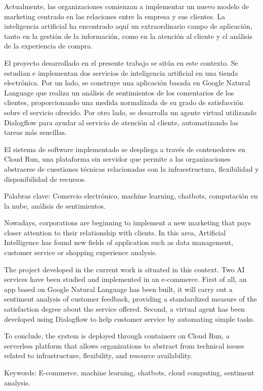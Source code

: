 
\normalsize {}	
Actualmente, las organizaciones comienzan a implementar un nuevo modelo de marketing
centrado en las relaciones entre la empresa y sus clientes. La inteligencia artificial ha encontrado aquí un extraordinario campo de aplicación, tanto en la gestión de la información, como en la atención al cliente y el análisis de la experiencia de compra.

El proyecto desarrollado en el presente trabajo se sitúa en este contexto. Se estudian e implementan dos servicios de inteligencia artificial en una tienda electrónica. Por un lado, se construye una aplicación basada en Google Natural Language que realiza un análisis de sentimientos de los comentarios de los clientes, proporcionando una medida normalizada de su grado de satisfacción sobre el servicio ofrecido. Por otro lado, se desarrolla un agente virtual utilizando Dialogflow para ayudar al servicio de atención al cliente, automatizando las tareas más sencillas.

El sistema de software implementado se despliega a través de contenedores en Cloud Run, una plataforma sin servidor que permite a las organizaciones abstraerse de cuestiones técnicas relacionadas con la infraestructura, flexibilidad y disponibilidad de recursos.

\vspace{.5cm}

Palabras clave: Comercio electrónico, machine learning, chatbots, computación en la nube, análisis de sentimientos.

\vspace{1cm}

\newpage
 

Nowadays, corporations are beginning to implement a new marketing that pays closer attention to their relationship with clients. In this area, Artificial Intelligence has found new fields of application such as data management, customer service or shopping experience analysis.

The project developed in the current work is situated in this context. Two AI services have been studied and implemented in an e-commerce. First of all, an app based on Google Natural Language has been built, it will carry out a sentiment analysis of customer feedback, providing a standardized measure of the satisfaction degree about the service offered. Second, a virtual agent has been developed using Dialogflow to help customer service by automating simple tasks.

To conclude, the system is deployed through containers on Cloud Run, a serverless platform that allows organizations to abstract from technical issues related to infrastructure, flexibility, and resource availability.

\vspace{.5cm}

Keywords: E-commerce, machine learning, chatbots, cloud computing, sentiment analysis.
